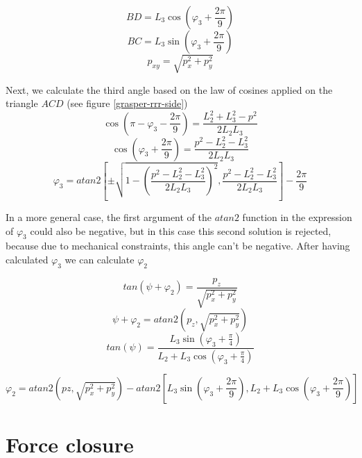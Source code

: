 \begin{equation}
BD = L_3 \cos \left(φ_3 + \frac{2π}{9} \right)
\end{equation}
\begin{equation}
BC = L_3 \sin \left(φ_3 + \frac{2π}{9} \right)
\end{equation}
\begin{equation}
p_{xy} = \sqrt{p_x^2 + p_y^2}
\end{equation}

Next, we calculate the third angle based on the law of cosines applied on the triangle $ACD$ (see figure \ref{grasper-rrr-side})
\begin{equation}
\cos \left( π - φ_3 - \frac{2π}{9} \right) = \frac{L_2^2 + L_3^2 - p^2}{2 L_2 L_3}
\end{equation}
\begin{equation}
\cos \left(φ_3 + \frac{2π}{9} \right) = \frac{p^2 - L_2^2 - L_3^2}{2 L_2 L_3}
\end{equation}
\begin{equation}
φ_3 = atan2 \left[ \pm \sqrt{1 - \left( \frac{p^2 - L_2^2 - L_3^2}{2 L_2 L_3} \right)^2} , \frac{p^2 - L_2^2 - L_3^2}{2 L_2 L_3} \right] - \frac{2π}{9}
\end{equation}

In a more general case, the first argument of the $atan2$ function in the expression of $φ_3$ could also be negative,
but in this case this second solution is rejected, because due to mechanical constraints, this angle can't be negative. 
After having calculated $φ_3$ we can calculate $φ_2 $

\begin{equation}
tan \left( ψ + φ_2 \right) = \frac{p_z}{\sqrt{p_x^2 + p_y^2}}
\end{equation}
\begin{equation}
ψ + φ_2 = atan2 \left( p_z, \sqrt{p_x^2 + p_y^2} \right)
\end{equation}
\begin{equation}
tan \left( ψ \right) = \frac{L_3 \sin \left( φ_3 + \frac{π}{4} \right) }{L_2 + L_3 \cos \left( φ_3 + \frac{π}{4} \right)}
\end{equation}

\begin{equation}
φ_2 = atan2 \left( pz, \sqrt{p_x^2 + p_y^2} \right) - atan2 \left[ L_3 \sin \left( φ_3 + \frac{2π}{9} \right), L_2 + L_3 \cos \left( φ_3 + \frac{2π}{9} \right) \right]
\end{equation}

\section{Force closure}

